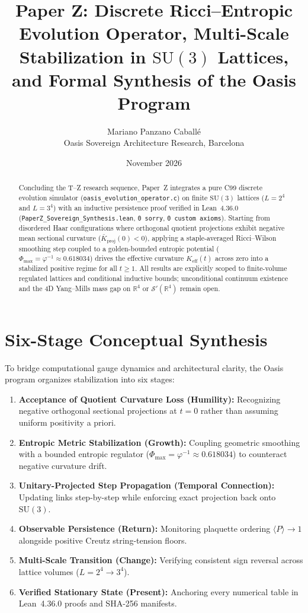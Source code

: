 \documentclass[11pt,a4paper]{article}
\title{Paper Z: Discrete Ricci--Entropic Evolution Operator, Multi-Scale Stabilization in $\mathrm{SU}(3)$ Lattices, and Formal Synthesis of the Oasis Program}
\author{Mariano Panzano Caball\'e \\ Oasis Sovereign Architecture Research, Barcelona}
\date{November 2026}
\begin{document}
\maketitle

\begin{abstract}
Concluding the T--Z research sequence, Paper~Z integrates a pure C99 discrete evolution simulator (\texttt{oasis\_evolution\_operator.c}) on finite $\mathrm{SU}(3)$ lattices ($L=2^4$ and $L=3^4$) with an inductive persistence proof verified in Lean~4.36.0 (\texttt{PaperZ\_Sovereign\_Synthesis.lean}, \texttt{0 sorry}, \texttt{0 custom axioms}). Starting from disordered Haar configurations where orthogonal quotient projections exhibit negative mean sectional curvature ($\bar{K}_{\mathrm{proj}}(0) < 0$), applying a staple-averaged Ricci--Wilson smoothing step coupled to a golden-bounded entropic potential ($\Phi_{\max} = \varphi^{-1} \approx 0.618034$) drives the effective curvature $K_{\mathrm{eff}}(t)$ across zero into a stabilized positive regime for all $t \ge 1$. All results are explicitly scoped to finite-volume regulated lattices and conditional inductive bounds; unconditional continuum existence and the 4D Yang--Mills mass gap on $\mathbb{R}^4$ or $\mathcal{S}'(\mathbb{R}^4)$ remain open.
\end{abstract}

\section{Six-Stage Conceptual Synthesis}
To bridge computational gauge dynamics and architectural clarity, the Oasis program organizes stabilization into six stages:
\begin{enumerate}
  \item \textbf{Acceptance of Quotient Curvature Loss (Humility):} Recognizing negative orthogonal sectional projections at $t=0$ rather than assuming uniform positivity a priori.
  \item \textbf{Entropic Metric Stabilization (Growth):} Coupling geometric smoothing with a bounded entropic regulator ($\Phi_{\max} = \varphi^{-1} \approx 0.618034$) to counteract negative curvature drift.
  \item \textbf{Unitary-Projected Step Propagation (Temporal Connection):} Updating links step-by-step while enforcing exact projection back onto $\mathrm{SU}(3)$.
  \item \textbf{Observable Persistence (Return):} Monitoring plaquette ordering $\langle P \rangle \to 1$ alongside positive Creutz string-tension floors.
  \item \textbf{Multi-Scale Transition (Change):} Verifying consistent sign reversal across lattice volumes ($L=2^4 \to 3^4$).
  \item \textbf{Verified Stationary State (Present):} Anchoring every numerical table in Lean~4.36.0 proofs and SHA-256 manifests.
\end{enumerate}
\end{document}
